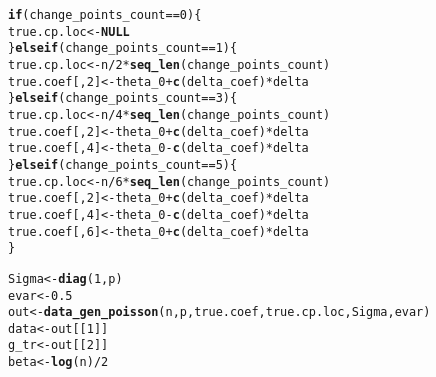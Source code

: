 \documentclass[article]{jss}\usepackage[]{graphicx}\usepackage[]{xcolor}
\makeatletter
\newcommand{\hlnum}[1]{\textcolor[rgb]{0.686,0.059,0.569}{#1}}%
\newcommand{\hlopt}[1]{\textcolor[rgb]{0,0,0}{#1}}%
\newcommand{\hlstd}[1]{\textcolor[rgb]{0.345,0.345,0.345}{#1}}%
\newcommand{\hlkwa}[1]{\textcolor[rgb]{0.161,0.373,0.58}{\textbf{#1}}}%
\newcommand{\hlkwb}[1]{\textcolor[rgb]{0.69,0.353,0.396}{#1}}%
\newcommand{\hlkwd}[1]{\textcolor[rgb]{0.737,0.353,0.396}{\textbf{#1}}}%
\newenvironment{kframe}{%
 \def\at@end@of@kframe{}%
 \ifinner\ifhmode%
  \def\at@end@of@kframe{\end{minipage}}%
  \begin{minipage}{\columnwidth}%
 \fi\fi%
 \def\FrameCommand##1{\hskip\@totalleftmargin \hskip-\fboxsep
 \colorbox{shadecolor}{##1}\hskip-\fboxsep
     \hskip-\linewidth \hskip-\@totalleftmargin \hskip\columnwidth}%
 \MakeFramed {\advance\hsize-\width
   \@totalleftmargin\z@ \linewidth\hsize
   \@setminipage}}%
 {\par\unskip\endMakeFramed%
 \at@end@of@kframe}
\newenvironment{knitrout}{}{} %
\makeatother
\begin{document}
\begin{knitrout}
\begin{kframe}
\begin{alltt}
    \hlkwa{if} \hlstd{(change_points_count} \hlopt{==} \hlnum{0}\hlstd{) \{}
      \hlstd{true.cp.loc} \hlkwb{<-} \hlkwa{NULL}
    \hlstd{\}} \hlkwa{else if} \hlstd{(change_points_count} \hlopt{==} \hlnum{1}\hlstd{) \{}
      \hlstd{true.cp.loc} \hlkwb{<-} \hlstd{n} \hlopt{/} \hlnum{2} \hlopt{*} \hlkwd{seq_len}\hlstd{(change_points_count)}
      \hlstd{true.coef[,} \hlnum{2}\hlstd{]} \hlkwb{<-} \hlstd{theta_0} \hlopt{+} \hlkwd{c}\hlstd{(delta_coef)} \hlopt{*} \hlstd{delta}
    \hlstd{\}} \hlkwa{else if} \hlstd{(change_points_count} \hlopt{==} \hlnum{3}\hlstd{) \{}
      \hlstd{true.cp.loc} \hlkwb{<-} \hlstd{n} \hlopt{/} \hlnum{4} \hlopt{*} \hlkwd{seq_len}\hlstd{(change_points_count)}
      \hlstd{true.coef[,} \hlnum{2}\hlstd{]} \hlkwb{<-} \hlstd{theta_0} \hlopt{+} \hlkwd{c}\hlstd{(delta_coef)} \hlopt{*} \hlstd{delta}
      \hlstd{true.coef[,} \hlnum{4}\hlstd{]} \hlkwb{<-} \hlstd{theta_0} \hlopt{-} \hlkwd{c}\hlstd{(delta_coef)} \hlopt{*} \hlstd{delta}
    \hlstd{\}} \hlkwa{else if} \hlstd{(change_points_count} \hlopt{==} \hlnum{5}\hlstd{) \{}
      \hlstd{true.cp.loc} \hlkwb{<-} \hlstd{n} \hlopt{/} \hlnum{6} \hlopt{*} \hlkwd{seq_len}\hlstd{(change_points_count)}
      \hlstd{true.coef[,} \hlnum{2}\hlstd{]} \hlkwb{<-} \hlstd{theta_0} \hlopt{+} \hlkwd{c}\hlstd{(delta_coef)} \hlopt{*} \hlstd{delta}
      \hlstd{true.coef[,} \hlnum{4}\hlstd{]} \hlkwb{<-} \hlstd{theta_0} \hlopt{-} \hlkwd{c}\hlstd{(delta_coef)} \hlopt{*} \hlstd{delta}
      \hlstd{true.coef[,} \hlnum{6}\hlstd{]} \hlkwb{<-} \hlstd{theta_0} \hlopt{+} \hlkwd{c}\hlstd{(delta_coef)} \hlopt{*} \hlstd{delta}
    \hlstd{\}}

    \hlstd{Sigma} \hlkwb{<-} \hlkwd{diag}\hlstd{(}\hlnum{1}\hlstd{, p)}
    \hlstd{evar} \hlkwb{<-} \hlnum{0.5}
    \hlstd{out} \hlkwb{<-} \hlkwd{data_gen_poisson}\hlstd{(n, p, true.coef, true.cp.loc, Sigma, evar)}
    \hlstd{data} \hlkwb{<-} \hlstd{out[[}\hlnum{1}\hlstd{]]}
    \hlstd{g_tr} \hlkwb{<-} \hlstd{out[[}\hlnum{2}\hlstd{]]}
    \hlstd{beta} \hlkwb{<-} \hlkwd{log}\hlstd{(n)}\hlopt{/}\hlnum{2}


\end{alltt}
\end{kframe}
\end{knitrout}
\end{document}
